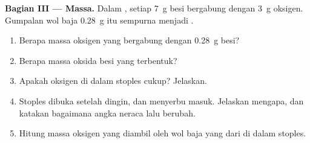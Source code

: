 \begin{problem}
\medskip
\noindent\textbf{Bagian III --- Massa.}
Dalam , setiap \qty{7}{g} besi bergabung dengan \qty{3}{g}
oksigen. Gumpalan wol baja \qty{0.28}{g} itu  sempurna menjadi
.
\begin{enumerate}[resume]
  \item Berapa massa oksigen yang bergabung dengan \qty{0.28}{g} besi?
  \item Berapa massa oksida besi yang terbentuk?
  \item Apakah oksigen di dalam stoples cukup? Jelaskan.
  \item Stoples dibuka setelah dingin, dan  menyerbu masuk. Jelaskan
        mengapa, dan katakan bagaimana angka neraca lalu berubah.
  \item Hitung massa oksigen yang diambil oleh wol baja yang  dari
         di dalam stoples.
\end{enumerate}
\end{problem}
